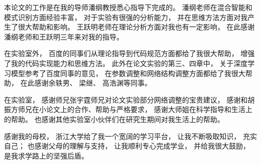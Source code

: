 \begin{thanks}

本论文的工作是在我的导师潘纲教授悉心指导下完成的。 潘纲老师在混合智能和模式识别方面经验丰富， 对于实验有很强的分析能力， 并在思维方法方面对我产生了很大帮助和影响。 王跃明老师在理论分析方面对我也有一定影响， 在此感谢潘纲老师和王跃明三年来对我的指导。

在实验室外， 百度的同事们从理论指导到代码规范方面都给了我很大帮助， 增强了我的代码实现能力和思维方法。 此外在论文实验的第三、四章中， 关于深度学习模型参考了百度同事的意见， 在参数调整和网络结构调整方面都给了我很大帮助， 在此感谢余轶男、 梁继、 高浩渊等同事。

在实验室， 感谢师兄张宇霆师兄对论文实验部分网络调整的宝贵建议， 感谢和胡振方师兄在小论文上的合作、帮助与严格要求， 感谢大师姐在科学指导和生活上的帮助。 也感谢其他实验室小伙伴们在研究生期间对我生活上的帮助。

感谢我的母校， 浙江大学给了我一个宽阔的学习平台， 让我不断吸取知识， 充实自己； 也感谢父母的理解与支持， 让我顺利专心完成学业， 并给我很大鼓励， 是我求学路上的坚强后盾。

\end{thanks}
